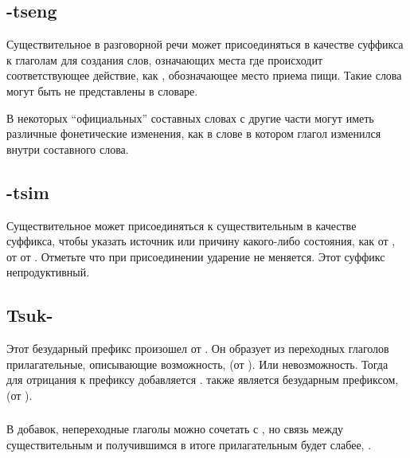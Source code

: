 \subsection{-tseng} Существительное   в разговорной речи
может присоединяться в качестве суффикса к глаголам для создания слов, означающих места где происходит соответствующее действие, как , обозначающее место приема пищи.  Такие слова могут быть не представлены в словаре.

В некоторых ``официальных'' составных словах с  другие части могут иметь различные фонетические изменения, как в слове   в котором глагол  изменился внутри составного слова.

\subsection{-tsim} Существительное   может присоединяться к существительным в качестве суффикса, чтобы указать источник или причину какого-либо состояния, как  
от  ,   от  
 
от  .  Отметьте что при присоединении ударение не меняется.  Этот суффикс непродуктивный.

\subsection{Tsuk-} Этот безударный префикс произошел от . Он образует из переходных глаголов прилагательные, описывающие возможность, 
 (от  ).  Или невозможность. Тогда для отрицания к префиксу добавляется .  также является безударным префиксом,
  (от  ).

\subsubsection{} В добавок, непереходные глаголы можно сочетать с , но связь между существительным и получившимся в итоге прилагательным будет слабее, 
  .

